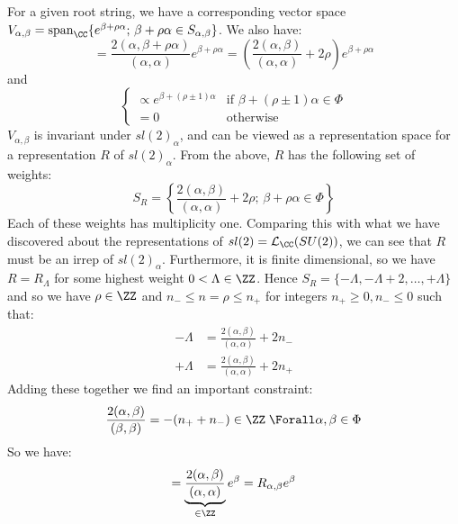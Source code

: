 \documentclass{jknotes}
\begin{document}
For a given root string, we have a corresponding vector space \(V_{\alpha,\beta} = \operatorname{span}_\CC\{e^{\beta+\rho\alpha};\,\beta+\rho\alpha \in S_{\alpha,\beta}\}\). We also have:
\begin{equation}
    [h^\alpha,e^{\beta+\rho\alpha}] = \frac{2(\alpha,\beta+\rho\alpha)}{(\alpha,\alpha)}e^{\beta+\rho\alpha} = \left( \frac{2(\alpha,\beta)}{(\alpha,\alpha)} + 2\rho \right)e^{\beta+\rho\alpha}
\end{equation}
and
\begin{equation}
    [e^{\pm\alpha},e^{\beta+\rho\alpha}] 
    \begin{cases}
        \propto e^{\beta+(\rho\pm1)\alpha} & \text{if } \beta+(\rho\pm1)\alpha \in \Phi\\
        = 0 & \text{otherwise}
    \end{cases}
\end{equation}
\(V_{\alpha,\beta}\) is invariant under \(sl(2)_\alpha\), and can be viewed as a representation space for a representation \(R\) of \(sl(2)_\alpha\). From the above, \(R\) has the following set of weights:
\begin{equation}
    S_R = \left\{ \frac{2(\alpha,\beta)}{(\alpha,\alpha)}+2\rho;\,\beta+\rho\alpha \in \Phi \right\}
\end{equation}
Each of these weights has multiplicity one. Comparing this with what we have discovered about the representations of \(sl(2) = \mathcal{L}_\CC(SU(2))\), we can see that \(R\) must be an irrep of \(sl(2)_\alpha\). Furthermore, it is finite dimensional, so we have \(R=R_\Lambda\) for some highest weight \(0 < \Lambda\in\ZZ\). Hence \(S_R = \{-\Lambda,-\Lambda+2,\dots,+\Lambda\}\) and so we have \(\rho \in \ZZ\) and \(n_- \le n = \rho \le n_+\) for integers \(n_+ \ge 0, n_- \le 0\) such that:
\begin{align}
    -\Lambda &= \frac{2(\alpha,\beta)}{(\alpha,\alpha)} + 2n_- \\
    +\Lambda &= \frac{2(\alpha,\beta)}{(\alpha,\alpha)} + 2n_+
\end{align}
Adding these together we find an important constraint:
\begin{equation}
    \frac{2(\alpha,\beta)}{(\beta,\beta)} = -(n_++n_-) \in \ZZ \; \Forall \alpha,\beta \in \Phi
\end{equation}
So we have:
\begin{equation}
    [h^\alpha,e^\beta] = \underbrace{\frac{2(\alpha,\beta)}{(\alpha,\alpha)}}_{\in \ZZ} e^\beta = R_{\alpha,\beta} e^{\beta}
\end{equation}
\end{document}

